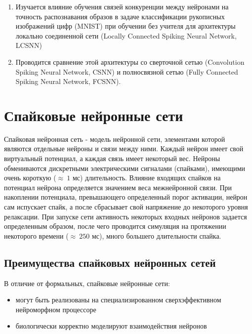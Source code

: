 \documentclass[a4paper]{article}
\begin{document}
\begin{enumerate}
 \item Изучается влияние обучения связей конкуренции \cite{MaxActiv1} \cite{MaxActiv2} между нейронами на точность распознавания образов в задаче классификации рукописных изображений цифр (MNIST) при обучении без учителя для архитектуры локально соединенной сети (Locally Connected Spiking Neural Network, LCSNN) \cite{saunders2019locally}
 
 \item Проводится сравнение этой архитектуры со сверточной сетью (Convolution Spiking Neural Network, CSNN) и полносвязной сетью (Fully Connected Spiking Neural Network, FCSNN).

\end{enumerate}

\clearpage

\section{Спайковые нейронные сети}
Спайковая нейронная сеть - модель нейронной сети, элементами которой являются  отдельные нейроны и связи между ними. Каждый нейрон имеет свой виртуальный потенциал, а каждая связь имеет некоторый вес. Нейроны обмениваются дискретными электрическими сигналами (спайками), имеющими очень короткую ($ \approx ~1$ мс) длительность. Влияние входящих спайков на потенциал нейрона определяется значением веса межнейронной связи. При накоплении потенциала, превышающего определенный порог активации, нейрон сам испускает спайк, а после сбрасывает свой напряжение до некоторого уровня релаксации. При запуске сети активность некоторых входных нейронов задается определенным образом, после чего проводится симуляция на протяжении некоторого времени ($\approx ~250$ мс), много большего длительности спайка.


\subsection{Преимущества спайковых нейронных сетей}
В отличие от формальных, спайковые нейронные сети:

\begin{itemize}
 \item могут быть реализованы на специализированном сверхэффективном нейроморфном процессоре
 \item биологически корректно моделируют взаимодействия нейронов
\end{itemize}
\end{document}
